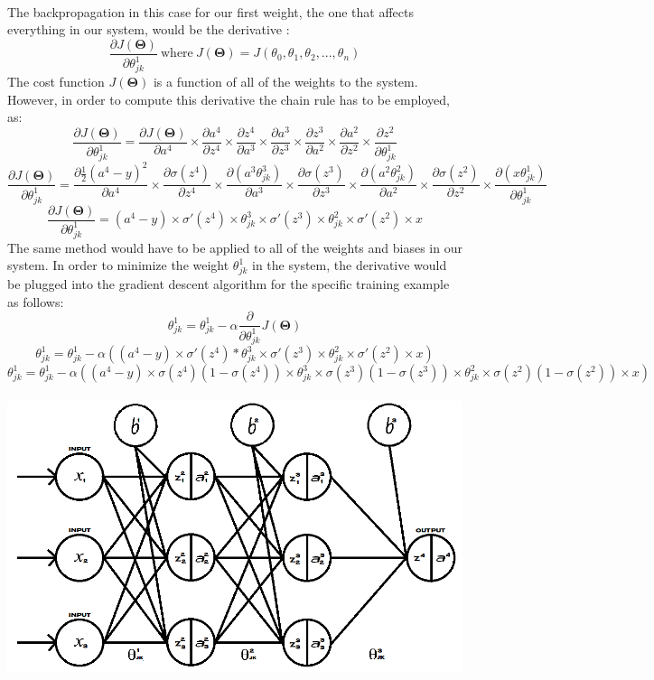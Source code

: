 \documentclass[a4paper,12pt]{article}
\begin{document}
\\ The backpropagation in this case for our first weight, the one that affects everything in our system, would be the derivative \cite{backpropagation}:
\[\frac{\partial J(\boldsymbol{\Theta})}{\partial \theta_{jk}^1} \ \text{where} \ J(\boldsymbol{\Theta}) = J(\theta_0, \theta_1, \theta_2,...,\theta_n)\] 
The cost function $J(\boldsymbol{\Theta})$ is a function of all of the weights to the system. However, in order to compute this derivative the chain rule has to be employed, as:
\[\frac{\partial J(\boldsymbol{\Theta})}{\partial \theta_{jk}^1} = \frac{\partial J(\boldsymbol{\Theta})}{\partial a^4} \times \frac{\partial a^4}{\partial z^4} \times \frac{\partial z^4}{\partial a^3} \times \frac{\partial a^3}{\partial z^3} \times \frac{\partial z^3}{\partial a^2} \times \frac{\partial a^2}{\partial z^2} \times \frac{\partial z^2}{\partial \theta^1_{jk}}\]
\[\frac{\partial J(\boldsymbol{\Theta})}{\partial \theta_{jk}^1} = \frac{\partial \frac{1}{2}(a^4 - y)^2}{\partial a^4} \times \frac{\partial \sigma(z^4)}{\partial z^4} \times \frac{\partial (a^3\theta^3_{jk})}{\partial a^3} \times \frac{\partial \sigma(z^3)}{\partial z^3} \times \frac{\partial (a^2\theta_{jk}^2)}{\partial a^2} \times \frac{\partial \sigma(z^2)}{\partial z^2} \times \frac{\partial (x\theta_{jk}^1)}{\partial \theta_{jk}^1}\]
\[\frac{\partial J(\boldsymbol{\Theta})}{\partial \theta_{jk}^1} = (a^4 - y) \times \sigma'(z^4) \times \theta_{jk}^3 \times \sigma'(z^3) \times \theta_{jk}^2 \times \sigma'(z^2) \times x\]
The same method would have to be applied to all of the weights and biases in our system. In order to minimize the weight $\theta_{jk}^1$ in the system, the derivative would be plugged into the gradient descent algorithm for the specific training example as follows:
 \[\theta_{jk}^1 = \theta_{jk}^1 - \alpha \frac{\partial}{\partial\theta_{jk}^1} J(\boldsymbol{\Theta})\]
\[\theta_{jk}^1 = \theta_{jk}^1 - \alpha ((a^4 - y) \times \sigma'(z^4) * \theta_{jk}^3 \times \sigma'(z^3) \times \theta_{jk}^2 \times \sigma'(z^2) \times x)\]
\[\theta_{jk}^1 = \theta_{jk}^1 - \alpha ((a^4 - y) \times \sigma(z^4)(1-\sigma(z^4)) \times \theta_{jk}^3 \times \sigma(z^3)(1-\sigma(z^3)) \times \theta_{jk}^2 \times \sigma(z^2)(1-\sigma(z^2)) \times x)\]
\\
\includegraphics[scale=0.548]{multidimension}
\end{document}
